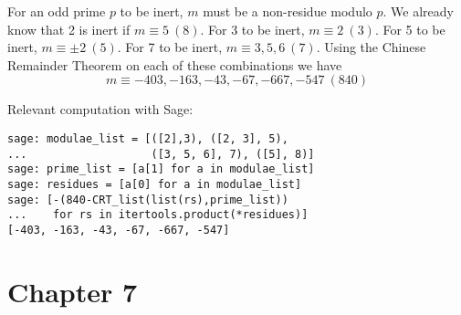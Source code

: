 \documentclass{article}
\newcommand{\modequiv}[3]{#1 \equiv #2\ (#3)}
\begin{document}
\begin{enumerate}
    For an odd prime $p$ to be inert, $m$ must be a non-residue modulo $p$.  We already know that 2 is inert if $\modequiv{m}{5}{8}$.  For 3 to be inert, $\modequiv{m}{2}{3}$.  For 5 to be inert, $\modequiv{m}{\pm 2}{5}$.  For 7 to be inert, $\modequiv{m}{3, 5, 6}{7}$.  Using the Chinese Remainder Theorem on each of these combinations we have \[ \modequiv{m}{-403, -163, -43, -67, -667, -547}{840} \]

    Relevant computation with Sage:
\begin{verbatim}
sage: modulae_list = [([2],3), ([2, 3], 5),
...                   ([3, 5, 6], 7), ([5], 8)]
sage: prime_list = [a[1] for a in modulae_list]
sage: residues = [a[0] for a in modulae_list]
sage: [-(840-CRT_list(list(rs),prime_list))
...    for rs in itertools.product(*residues)]
[-403, -163, -43, -67, -667, -547]
\end{verbatim}

\end{enumerate}

\section*{Chapter 7}
\end{document}
